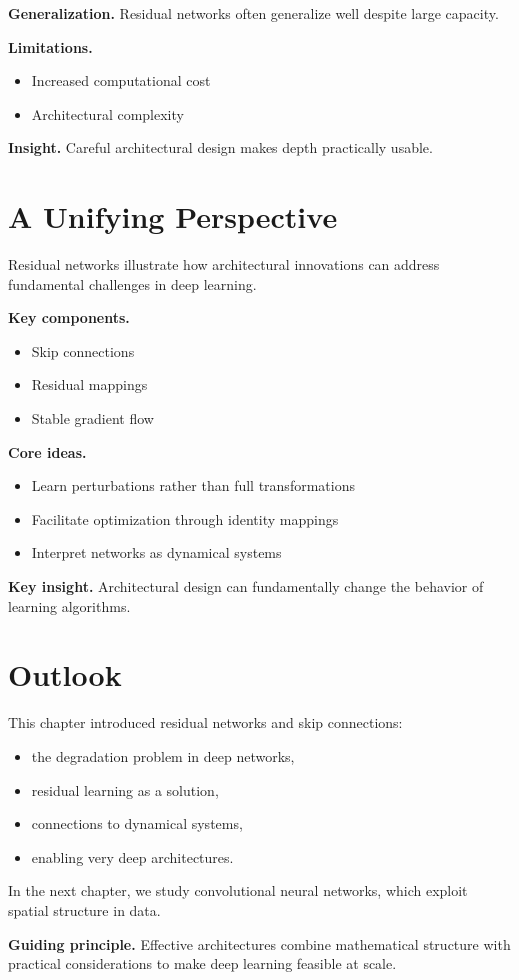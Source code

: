 \medskip

\noindent
\textbf{Generalization.}  
Residual networks often generalize well despite large capacity.

\medskip

\noindent
\textbf{Limitations.}
\begin{itemize}
    \item Increased computational cost
    \item Architectural complexity
\end{itemize}

\medskip

\noindent
\textbf{Insight.}  
Careful architectural design makes depth practically usable.

\section{A Unifying Perspective}

Residual networks illustrate how architectural innovations can address fundamental challenges in deep learning.

\medskip

\noindent
\textbf{Key components.}
\begin{itemize}
    \item Skip connections
    \item Residual mappings
    \item Stable gradient flow
\end{itemize}

\medskip

\noindent
\textbf{Core ideas.}
\begin{itemize}
    \item Learn perturbations rather than full transformations
    \item Facilitate optimization through identity mappings
    \item Interpret networks as dynamical systems
\end{itemize}

\medskip

\noindent
\textbf{Key insight.}  
Architectural design can fundamentally change the behavior of learning algorithms.

\section{Outlook}

This chapter introduced residual networks and skip connections:
\begin{itemize}
    \item the degradation problem in deep networks,
    \item residual learning as a solution,
    \item connections to dynamical systems,
    \item enabling very deep architectures.
\end{itemize}

\medskip

In the next chapter, we study convolutional neural networks, which exploit spatial structure in data.

\medskip

\noindent
\textbf{Guiding principle.}  
Effective architectures combine mathematical structure with practical considerations to make deep learning feasible at scale.